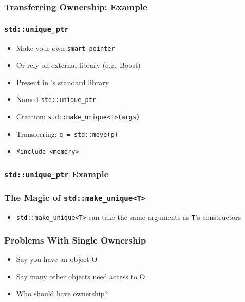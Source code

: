 \begin{frame}
  \frametitle{Transferring Ownership: Example}
\end{frame}

\begin{frame}
  \frametitle{\tt std::unique\_ptr}
  \begin{itemize}
    \item Make your own {\tt smart\_pointer}
    \item Or rely on external library (e.g.~Boost)
  \end{itemize}
  \vskip5mm
  \begin{itemize}
    \item Present in \cpp's standard library
    \item Named {\tt std::unique\_ptr}
    \item Creation: {\tt std::make\_unique<T>(args)}
    \item Transferring: {\tt q = std::move(p)}
    \item {\tt \#include <memory>}
  \end{itemize}
\end{frame}

\begin{frame}
  \frametitle{{\tt std::unique\_ptr} Example}
\end{frame}

\begin{frame}
  \frametitle{The Magic of {\tt std::make\_unique<T>}}
  \begin{itemize}
    \item {\tt std::make\_unique<T>} can take the same arguments as {\tt T}'s constructors
  \end{itemize}
\end{frame}

\begin{frame}
  \frametitle{Problems With Single Ownership}
  \begin{itemize}
    \item Say you have an object O
    \item Say many other objects need access to O
    \item Who should have ownership?
  \end{itemize}
  \begin{center}
  \end{center}
\end{frame}

